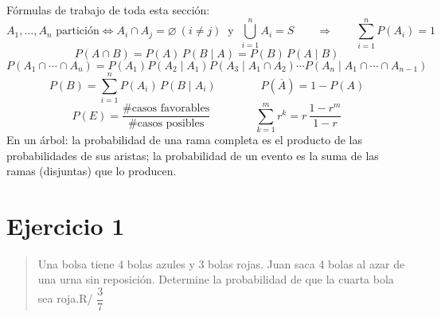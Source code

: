 \documentclass[11pt]{article}
\begin{document}
\begin{tip}
Fórmulas de trabajo de toda esta sección:
\[
A_1,\dots,A_n \text{ partición}\iff A_i\cap A_j=\varnothing\ (i\neq j)\ \text{ y }\ \bigcup_{i=1}^{n}A_i=S
\qquad\Longrightarrow\qquad \sum_{i=1}^{n}P(A_i)=1
\]
\[
P(A\cap B)=P(A)\,P(B\mid A)=P(B)\,P(A\mid B)
\]
\[
P(A_1\cap\cdots\cap A_n)=P(A_1)P(A_2\mid A_1)P(A_3\mid A_1\cap A_2)\cdots P(A_n\mid A_1\cap\cdots\cap A_{n-1})
\]
\[
P(B)=\sum_{i=1}^{n}P(A_i)\,P(B\mid A_i)
\qquad\qquad
P(\overline{A})=1-P(A)
\]
\[
P(E)=\frac{\#\text{casos favorables}}{\#\text{casos posibles}}
\qquad\qquad
\sum_{k=1}^{m}r^{k}=r\,\frac{1-r^{m}}{1-r}
\]
En un árbol: la probabilidad de una rama completa es el producto de las probabilidades de sus aristas; la probabilidad de un evento es la suma de las ramas (disjuntas) que lo producen.
\end{tip}

\section*{Ejercicio 1}

\begin{quote}
Una bolsa tiene 4 bolas azules y 3 bolas rojas. Juan saca 4 bolas al azar de una urna sin reposición. Determine la probabilidad de que la cuarta bola sea roja.\hfill R/ $\dfrac{3}{7}$
\end{quote}
\end{document}
